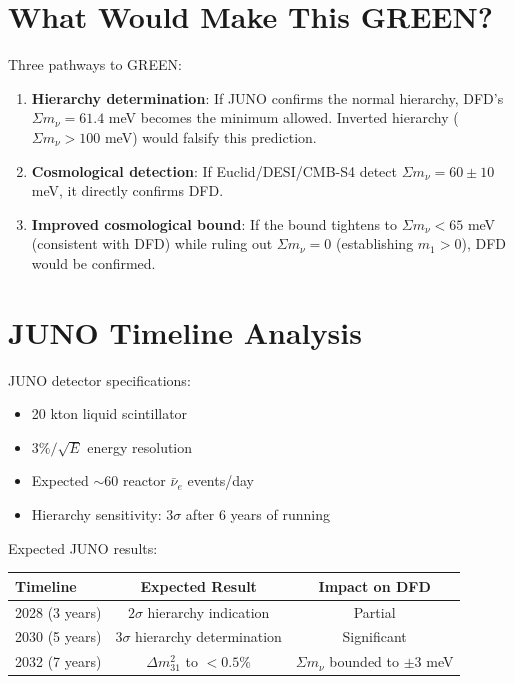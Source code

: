 \documentclass[11pt,a4paper]{article}
\begin{document}
\section{What Would Make This GREEN?}

Three pathways to GREEN:
\begin{enumerate}
\item \textbf{Hierarchy determination}: If JUNO confirms the normal hierarchy, DFD's $\Sigma m_\nu = 61.4$ meV becomes the minimum allowed. Inverted hierarchy ($\Sigma m_\nu > 100$ meV) would falsify this prediction.
\item \textbf{Cosmological detection}: If Euclid/DESI/CMB-S4 detect $\Sigma m_\nu = 60 \pm 10$ meV, it directly confirms DFD.
\item \textbf{Improved cosmological bound}: If the bound tightens to $\Sigma m_\nu < 65$ meV (consistent with DFD) while ruling out $\Sigma m_\nu = 0$ (establishing $m_1 > 0$), DFD would be confirmed.
\end{enumerate}

\section{JUNO Timeline Analysis}

JUNO detector specifications:
\begin{itemize}
\item 20 kton liquid scintillator
\item $3\%/\sqrt{E}$ energy resolution
\item Expected $\sim 60$ reactor $\bar{\nu}_e$ events/day
\item Hierarchy sensitivity: $3\sigma$ after 6 years of running
\end{itemize}

Expected JUNO results:
\begin{center}
\begin{tabular}{lcc}
\toprule
\textbf{Timeline} & \textbf{Expected Result} & \textbf{Impact on DFD} \\
\midrule
2028 (3 years) & $2\sigma$ hierarchy indication & Partial \\
2030 (5 years) & $3\sigma$ hierarchy determination & Significant \\
2032 (7 years) & $\Delta m^2_{31}$ to $< 0.5\%$ & $\Sigma m_\nu$ bounded to $\pm 3$ meV \\
\bottomrule
\end{tabular}
\end{center}
\end{document}
